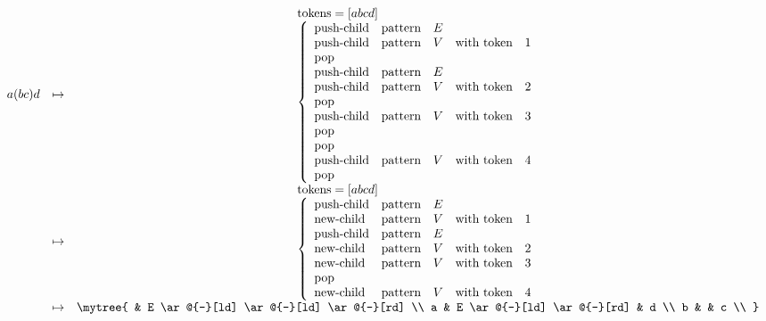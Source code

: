 	\begin{equation*}\begin{array}{ccccc} %
		a (b c) d &\mapsto&  \begin{array}{l}
			\text{tokens} = \word{abcd} \\
			\left\{\begin{array}{lllll}
				\text{push-child} &\text{pattern}& E \\
				\text{push-child}  &\text{pattern}& V &\text{with token}& 1 \\
				\text{pop} \\
				\text{push-child} &\text{pattern}& E \\
				\text{push-child}  &\text{pattern}& V &\text{with token}& 2 \\
				\text{pop} \\
				\text{push-child}  &\text{pattern}& V &\text{with token}& 3 \\
				\text{pop} \\
				\text{pop} \\
				\text{push-child}  &\text{pattern}& V &\text{with token}& 4 \\
				\text{pop} \\
			\end{array}\right.%
		\end{array} \\
		&\mapsto& \begin{array}{l}
			\text{tokens} = \word{abcd} \\
			\left\{\begin{array}{lllll}
				\text{push-child} &\text{pattern}& E \\
				\text{new-child}  &\text{pattern}& V &\text{with token}& 1 \\
				\text{push-child} &\text{pattern}& E \\
				\text{new-child}  &\text{pattern}& V &\text{with token}& 2 \\
				\text{new-child}  &\text{pattern}& V &\text{with token}& 3 \\
				\text{pop} \\
				\text{new-child}  &\text{pattern}& V &\text{with token}& 4 \\
			\end{array}\right.%
		\end{array} \\
		&\mapsto& \mytree {
			& E \ar@{-}[ld] \ar@{-}[ld] \ar@{-}[rd] \\
			a & E \ar@{-}[ld] \ar@{-}[rd] & d \\
			b & & c \\
		}
	\end{array}\end{equation*} %
\endgroup %
